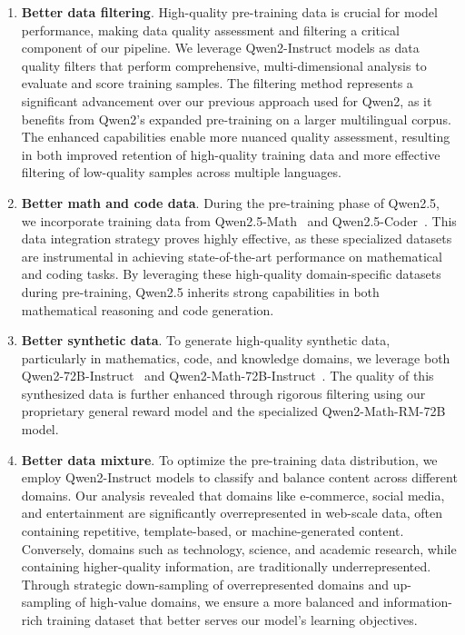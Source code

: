 \begin{enumerate}[label=(\arabic*)]
    \item \textbf{Better data filtering}. High-quality pre-training data is crucial for model performance, making data quality assessment and filtering a critical component of our pipeline. We leverage Qwen2-Instruct models as data quality filters that perform comprehensive, multi-dimensional analysis to evaluate and score training samples. The filtering method represents a significant advancement over our previous approach used for Qwen2, as it benefits from Qwen2's expanded pre-training on a larger multilingual corpus. The enhanced capabilities enable more nuanced quality assessment, resulting in both improved retention of high-quality training data and more effective filtering of low-quality samples across multiple languages.

    \item \textbf{Better math and code data}. During the pre-training phase of Qwen2.5, we incorporate training data from Qwen2.5-Math~\citep{qwen2.5math} and Qwen2.5-Coder~\citep{qwen2.5coder}. This data integration strategy proves highly effective, as these specialized datasets are instrumental in achieving state-of-the-art performance on mathematical and coding tasks. By leveraging these high-quality domain-specific datasets during pre-training, Qwen2.5 inherits strong capabilities in both mathematical reasoning and code generation.

    \item \textbf{Better synthetic data}. To generate high-quality synthetic data, particularly in mathematics, code, and knowledge domains, we leverage both Qwen2-72B-Instruct~\citep{qwen2} and Qwen2-Math-72B-Instruct~\citep{qwen2math}. The quality of this synthesized data is further enhanced through rigorous filtering using our proprietary general reward model and the specialized Qwen2-Math-RM-72B~\citep{qwen2math} model.

    \item \textbf{Better data mixture}. To optimize the pre-training data distribution, we employ Qwen2-Instruct models to classify and balance content across different domains. Our analysis revealed that domains like e-commerce, social media, and entertainment are significantly overrepresented in web-scale data, often containing repetitive, template-based, or machine-generated content. Conversely, domains such as technology, science, and  academic research, while containing higher-quality information, are traditionally underrepresented. Through strategic down-sampling of overrepresented domains and up-sampling of high-value domains, we ensure a more balanced and information-rich training dataset that better serves our model's learning objectives.
\end{enumerate}

